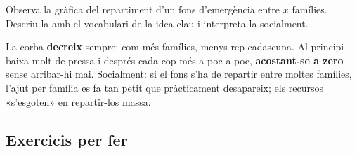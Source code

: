 \begin{exresolt}
Observa la gràfica del repartiment d'un fons d'emergència entre $x$ famílies.
Descriu-la amb el vocabulari de la idea clau i interpreta-la socialment.

\begin{center}
\end{center}

\solucio
La corba \textbf{decreix} sempre: com més famílies, menys rep cadascuna. Al
principi baixa molt de pressa i després cada cop més a poc a poc, \textbf{acostant-se
a zero} sense arribar-hi mai. Socialment: si el fons s'ha de repartir entre moltes
famílies, l'ajut per família es fa tan petit que pràcticament desapareix; els
recursos «s'esgoten» en repartir-los massa.
\end{exresolt}

\subsection{Exercicis per fer}


